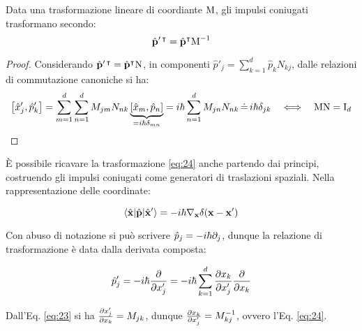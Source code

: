 \begin{proposition}
	Data una trasformazione lineare di coordiante $ \mathbf{\text{M}} $, gli impulsi coniugati trasformano secondo:
	\begin{equation}
		\hat{\mathbf{p}}'^{\,\intercal} = \hat{\mathbf{p}}^{\intercal} \mathbf{\text{M}}^{-1}
		\label{eq:24}
	\end{equation}
\end{proposition}
\begin{proof}
	Considerando $ \hat{\mathbf{p}}'^{\,\intercal} = \hat{\mathbf{p}}^{\intercal} \mathbf{\text{N}} $, in componenti $ \hat{p}'_j = \sum_{k = 1}^{d} \hat{p}_k N_{kj} $, dalle relazioni di commutazione canoniche si ha:
	\begin{equation*}
		\left[\hat{x}'_j, \hat{p}'_k\right] = \sum_{m = 1}^{d} \sum_{n = 1}^{d} M_{jm} N_{nk} \underbrace{\left[\hat{x}_m, \hat{p}_n\right]}_{= i \hbar \delta_{mn}} = i\hbar \sum_{n = 1}^{d} M_{jn} N_{nk} \,\dot{=}\, i\hbar \delta_{jk} \quad \Longleftrightarrow \quad \mathbf{\text{M}}\mathbf{\text{N}} = \mathbf{\text{I}}_d
	\end{equation*}
\end{proof}

È possibile ricavare la trasformazione \ref{eq:24} anche partendo dai principi, costruendo gli impulsi coniugati come generatori di traslazioni spaziali. Nella rappresentazione delle coordinate:

\begin{equation}
	\braket{\hat{\mathbf{x}} | \hat{\mathbf{p}} | \hat{\mathbf{x}}'} = - i\hbar \nabla_{\mathbf{x}}\delta(\mathbf{x} - \mathbf{x}')
	\label{eq:25}
\end{equation}

Con abuso di notazione si può scrivere $ \hat{p}_j = -i\hbar\partial_j $, dunque la relazione di trasformazione è data dalla derivata composta:

\begin{equation}
	\hat{p}'_j = -i\hbar \frac{\partial }{\partial x'_j} = -i\hbar \displaystyle\sum_{k = 1}^{d} \frac{\partial x_k}{\partial x'_j} \frac{\partial}{\partial x_k}
	\label{eq:26}
\end{equation}

Dall'Eq. \ref{eq:23} si ha $ \frac{\partial x'_j}{\partial x_k} = M_{jk} $, dunque $ \frac{\partial x_k}{\partial x'_j} = M^{-1}_{kj} $, ovvero l'Eq. \ref{eq:24}.










